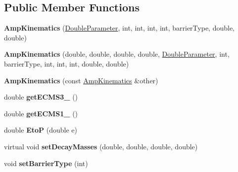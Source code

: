 \subsection*{Public Member Functions}
\begin{DoxyCompactItemize}
\item 
\hypertarget{class_amp_kinematics_ace5b6541a67975ab2959d9388bedafb7}{{\bfseries Amp\-Kinematics} (\hyperlink{class_double_parameter}{Double\-Parameter}, int, int, int, int, barrier\-Type, double, double)}\label{class_amp_kinematics_ace5b6541a67975ab2959d9388bedafb7}

\item 
\hypertarget{class_amp_kinematics_a7ab6c3b260a340337ff757c645f6040c}{{\bfseries Amp\-Kinematics} (double, double, double, double, \hyperlink{class_double_parameter}{Double\-Parameter}, int, barrier\-Type, int, int, int, double, double)}\label{class_amp_kinematics_a7ab6c3b260a340337ff757c645f6040c}

\item 
\hypertarget{class_amp_kinematics_a8aae4a1049a5a135370799b447f48d3c}{{\bfseries Amp\-Kinematics} (const \hyperlink{class_amp_kinematics}{Amp\-Kinematics} \&other)}\label{class_amp_kinematics_a8aae4a1049a5a135370799b447f48d3c}

\item 
\hypertarget{class_amp_kinematics_ae85be074eb945a308820f6a534e865d3}{double {\bfseries get\-E\-C\-M\-S3\-\_} ()}\label{class_amp_kinematics_ae85be074eb945a308820f6a534e865d3}

\item 
\hypertarget{class_amp_kinematics_a335620a155d93949ae8f51a966e28f3c}{double {\bfseries get\-E\-C\-M\-S1\-\_} ()}\label{class_amp_kinematics_a335620a155d93949ae8f51a966e28f3c}

\item 
\hypertarget{class_amp_kinematics_abe249f2dfca497bc9e0c09772dea5654}{double {\bfseries Eto\-P} (double e)}\label{class_amp_kinematics_abe249f2dfca497bc9e0c09772dea5654}

\item 
\hypertarget{class_amp_kinematics_a27f22245aeb15716c14132f97266e1be}{virtual void {\bfseries set\-Decay\-Masses} (double, double, double, double)}\label{class_amp_kinematics_a27f22245aeb15716c14132f97266e1be}

\item 
\hypertarget{class_amp_kinematics_a568842f11435e7c791806ca2dce2fd02}{void {\bfseries set\-Barrier\-Type} (int)}\label{class_amp_kinematics_a568842f11435e7c791806ca2dce2fd02}


\end{DoxyCompactItemize}
